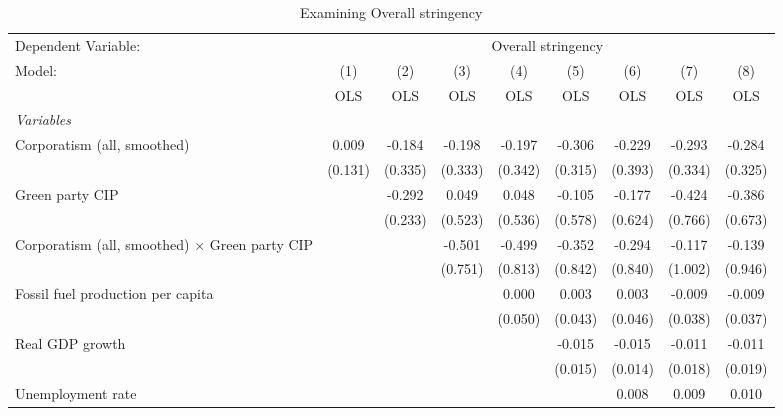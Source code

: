 
\begin{table}[htbp]
   \caption{Examining Overall stringency}
   \centering
   \begin{tabular}{lcccccccc}
      \toprule
      Dependent Variable: & \multicolumn{8}{c}{Overall stringency}\\
      Model:                                                & (1)     & (2)     & (3)     & (4)     & (5)     & (6)     & (7)     & (8)\\  
                                                            &  OLS    & OLS     & OLS     & OLS     & OLS     & OLS     & OLS     & OLS\\  
      \midrule
      \emph{Variables}\\
      Corporatism (all, smoothed)                           & 0.009   & -0.184  & -0.198  & -0.197  & -0.306  & -0.229  & -0.293  & -0.284\\   
                                                            & (0.131) & (0.335) & (0.333) & (0.342) & (0.315) & (0.393) & (0.334) & (0.325)\\   
      Green party CIP                                       &         & -0.292  & 0.049   & 0.048   & -0.105  & -0.177  & -0.424  & -0.386\\   
                                                            &         & (0.233) & (0.523) & (0.536) & (0.578) & (0.624) & (0.766) & (0.673)\\   
      Corporatism (all, smoothed) $\times$ Green party CIP  &         &         & -0.501  & -0.499  & -0.352  & -0.294  & -0.117  & -0.139\\   
                                                            &         &         & (0.751) & (0.813) & (0.842) & (0.840) & (1.002) & (0.946)\\   
      Fossil fuel production per capita                     &         &         &         & 0.000   & 0.003   & 0.003   & -0.009  & -0.009\\   
                                                            &         &         &         & (0.050) & (0.043) & (0.046) & (0.038) & (0.037)\\   
      Real GDP growth                                       &         &         &         &         & -0.015  & -0.015  & -0.011  & -0.011\\   
                                                            &         &         &         &         & (0.015) & (0.014) & (0.018) & (0.019)\\   
      Unemployment rate                                     &         &         &         &         &         & 0.008   & 0.009   & 0.010\\   

\end{tabular}
\end{table}
